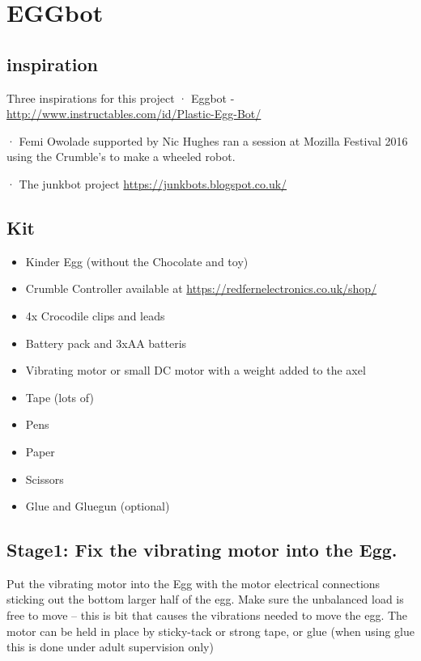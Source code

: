 \chapter{EGGbot}
\section{inspiration}
Three inspirations for this project
·      Eggbot - \url{http://www.instructables.com/id/Plastic-Egg-Bot/}
 
·  	Femi Owolade supported by Nic Hughes ran a session at Mozilla Festival 2016 using the Crumble’s to make a wheeled robot.
 
·  	The junkbot project \url{https://junkbots.blogspot.co.uk/}

\section{Kit}
\begin{itemize}
    \item Kinder Egg (without the Chocolate and toy)
    \item Crumble Controller available at \url{https://redfernelectronics.co.uk/shop/}
    \item 4x Crocodile clips and leads
    \item Battery pack and 3xAA batteris
    \item Vibrating motor or small DC motor with a weight added to the axel
    \item Tape (lots of)
    \item Pens
    \item Paper
    \item Scissors
    \item Glue and Gluegun (optional)
\end{itemize}
\section{Stage1: Fix the vibrating motor into the Egg.}

Put the vibrating motor into the Egg with the motor electrical connections sticking out the bottom larger half of the egg. Make sure the unbalanced load is free to move – this is bit that causes the vibrations needed to move the egg. The motor can be held in place by sticky-tack or strong tape, or glue (when using glue this is done under adult supervision only)

